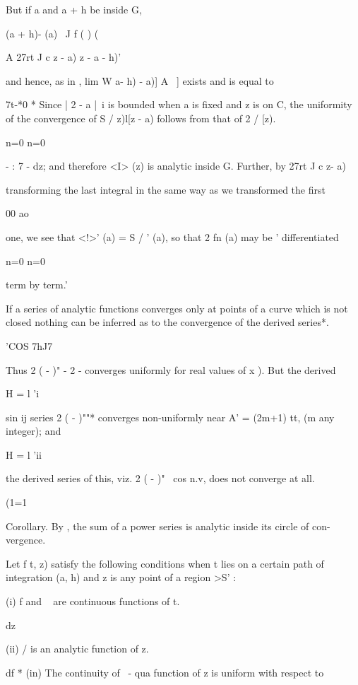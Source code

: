 {{But if a and a + h be inside G,

 (a + h)- (a) \ J f ( ) (

A 27rt J c z - a) z - a - h)'

and hence, as in , lim W a- h) - a)] A~ ] exists and is equal to

7t-*0 * Since | 2 - a |~i is bounded when a is fixed and z is on C,
the uniformity of the convergence of S / z)l[z - a) follows from that
of 2 / [z).

n=0 n=0

%
%

  - : 7 - dz; and therefore <I> (z) is analytic inside G. Further, by
27rt J c z- a)

transforming the last integral in the same way as we transformed the
first

00 ao

one, we see that <!>' (a) = S / ' (a), so that 2 fn (a) may be '
differentiated

n=0 n=0

term by term.'

If a series of analytic functions converges only at points of a curve
which is not closed nothing can be inferred as to the convergence of
the derived series*.

'COS 7hJ7

Thus 2 ( - )" - 2 - converges uniformly for real values of x ).
But the derived

H = l 'i

  sin ij series 2 ( - )""* converges non-uniformly near A' = (2m+1)
tt, (m any integer); and

H = l 'ii

the derived series of this, viz. 2 ( - )"~ cos n.v, does not converge
at all.

(1=1

Corollary. By , the sum of a power series is analytic inside its
circle of con- vergence.


Let f t, z) satisfy the following conditions when t lies on a certain
path of integration (a, h) and z is any point of a region >S' :

(i) f and ~ are continuous functions of t.

   dz

(ii) / is an analytic function of z.

df * (in) The continuity of ~- qua function of z is uniform with
respect to

}}
